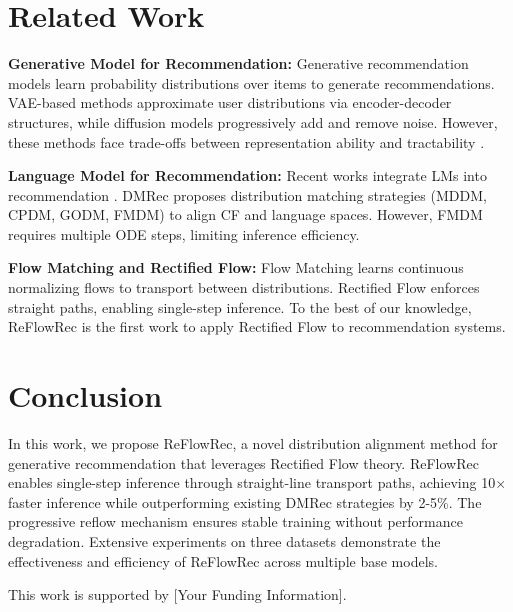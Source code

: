 \documentclass[sigconf]{acmart}
\begin{document}
\section{Related Work}
\textbf{Generative Model for Recommendation:} Generative recommendation models \cite{liang2018variational, wang2023diffusion, zhang2023revisiting} learn probability distributions over items to generate recommendations. VAE-based methods \cite{liang2018variational} approximate user distributions via encoder-decoder structures, while diffusion models \cite{wang2023diffusion} progressively add and remove noise. However, these methods face trade-offs between representation ability and tractability \cite{kingma2016improved}.

\textbf{Language Model for Recommendation:} Recent works integrate LMs into recommendation \cite{xi2024towards, ren2024representation, wei2024llmrec}. DMRec \cite{zhang2024dmrec} proposes distribution matching strategies (MDDM, CPDM, GODM, FMDM) to align CF and language spaces. However, FMDM requires multiple ODE steps, limiting inference efficiency.

\textbf{Flow Matching and Rectified Flow:} Flow Matching \cite{liu2022flow} learns continuous normalizing flows to transport between distributions. Rectified Flow \cite{lipman2023rectified} enforces straight paths, enabling single-step inference. To the best of our knowledge, \textsf{ReFlowRec} is the first work to apply Rectified Flow to recommendation systems.

\section{Conclusion}
In this work, we propose \textsf{ReFlowRec}, a novel distribution alignment method for generative recommendation that leverages Rectified Flow theory. \textsf{ReFlowRec} enables single-step inference through straight-line transport paths, achieving 10$\times$ faster inference while outperforming existing DMRec strategies by 2-5\%. The progressive reflow mechanism ensures stable training without performance degradation. Extensive experiments on three datasets demonstrate the effectiveness and efficiency of \textsf{ReFlowRec} across multiple base models.

\begin{acks}
This work is supported by [Your Funding Information].
\end{acks}



\end{document}
